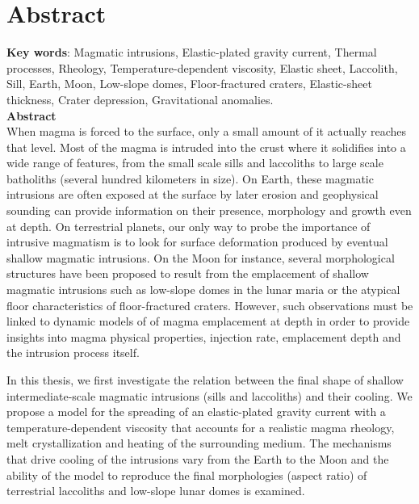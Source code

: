\chapter{Abstract}


\textbf{Key  words}:   Magmatic  intrusions,   Elastic-plated  gravity
current, Thermal processes, Rheology, Temperature-dependent viscosity,
Elastic  sheet,   Laccolith,  Sill,  Earth,  Moon,   Low-slope  domes,
Floor-fractured craters, Elastic-sheet thickness, Crater depression,
Gravitational anomalies.\\

\textbf{Abstract}\\

When  magma is  forced  to the  surface,  only a  small  amount of  it
actually reaches  that level. Most of  the magma is intruded  into the
crust where  it solidifies  into a  wide range  of features,  from the
small scale  sills and laccoliths  to large scale  batholiths (several
hundred kilometers in  size). On Earth, these  magmatic intrusions are
often exposed at the surface by later erosion and geophysical sounding
can provide information on their  presence, morphology and growth even
at  depth.   On  terrestrial  planets,  our  only  way  to  probe  the
importance of intrusive  magmatism is to look  for surface deformation
produced by  eventual shallow  magmatic intrusions.   On the  Moon for
instance,  several  morphological  structures have  been  proposed  to
result from  the emplacement  of shallow  magmatic intrusions  such as
low-slope   domes  in   the  lunar   maria  or   the  atypical   floor
characteristics   of    floor-fractured   craters.     However,   such
observations must be linked to  dynamic models of of magma emplacement
at depth in order to  provide insights into magma physical properties,
injection rate, emplacement depth and the intrusion process itself.

In this  thesis, we first  investigate the relation between  the final
shape  of shallow  intermediate-scale magmatic  intrusions (sills  and
laccoliths) and their  cooling.  We propose a model  for the spreading
of  an elastic-plated  gravity  current  with a  temperature-dependent
viscosity  that   accounts  for  a  realistic   magma  rheology,  melt
crystallization and heating of the surrounding medium.  The mechanisms
that drive cooling  of the intrusions vary from the  Earth to the Moon
and  the ability  of the  model  to reproduce  the final  morphologies
(aspect ratio) of terrestrial laccoliths  and low-slope lunar domes is
examined.

